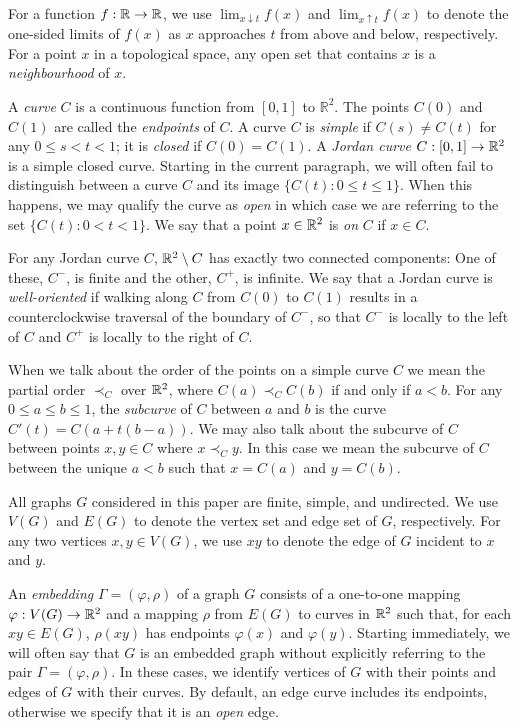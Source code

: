 \documentclass{patmorin}
\begin{document}
For a function $f:\mathbb{R}\to\mathbb{R}$, we use $\lim_{x\downarrow t} f(x)$ and
$\lim_{x\uparrow t} f(x)$ to denote the one-sided limits of $f(x)$
as $x$ approaches $t$ from above and below, respectively.  For a
point $x$ in a topological space, any open set that contains $x$ is a
\emph{neighbourhood} of $x$.  

A \emph{curve} $C$ is a continuous function from $[0,1]$
to $\mathbb{R}^2$.  The points $C(0)$ and $C(1)$ are called the
\emph{endpoints} of $C$.  A curve $C$ is \emph{simple} if $C(s)\neq C(t)$
for any $0\le s<t< 1$; it is \emph{closed} if $C(0)=C(1)$.  A \emph{Jordan
curve} $C:[0,1]\to\mathbb{R}^2$ is a simple closed curve.  Starting in the current
paragraph, we will often fail to distinguish between a curve $C$ and its
image $\{C(t):0\le t\le 1\}$.  When this happens, we may qualify the curve as
\emph{open} in which case we are referring to the set $\{C(t):0< t< 1\}$.
We say that a point $x\in\mathbb{R}^2$ is \emph{on} $C$ if $x\in C$.  

For any Jordan curve $C$, $\mathbb{R}^2\setminus C$ has exactly two connected
components: One of these, $C^-$, is finite and the other, $C^+$, is
infinite.  We say that a Jordan curve is \emph{well-oriented} if walking
along $C$ from $C(0)$ to $C(1)$ results in a counterclockwise traversal
of the boundary of $C^-$, so that $C^-$ is locally to the left of $C$
and $C^+$ is locally to the right of $C$.

When we talk about the order of the points on a simple curve $C$ we
mean the partial order $\prec_C$ over $\mathbb{R}^2$, where $C(a)\prec_C C(b)$
if and only if $a<b$.  For any $0\le a\le b\le 1$, the \emph{subcurve}
of $C$ between $a$ and $b$ is the curve $C'(t)=C(a+t(b-a))$.  We may also
talk about the subcurve of $C$ between points $x,y\in C$ where $x\prec_C
y$. In this case we mean the subcurve of $C$ between the unique $a< b$
such that $x=C(a)$ and $y=C(b)$.

All graphs $G$ considered in this paper are finite, simple, and
undirected.   We use $V(G)$ and $E(G)$ to denote the vertex set and edge
set of $G$, respectively. For any two vertices $x,y\in V(G)$, we use $xy$
to denote the edge of $G$ incident to $x$ and $y$.

An \emph{embedding} $\Gamma=(\varphi,\rho)$ of a graph $G$ consists
of a one-to-one mapping $\varphi:V(G)\to\mathbb{R}^2$ and a mapping $\rho$ from
$E(G)$ to curves in $\mathbb{R}^2$ such that, for each $xy\in E(G)$, $\rho(xy)$
has endpoints $\varphi(x)$ and $\varphi(y)$.
Starting immediately,  we will often say that $G$ is an embedded graph
without explicitly referring to the pair $\Gamma=(\varphi,\rho)$.
In these cases, we identify vertices of $G$ with their
points and edges of $G$ with their curves. By default, an edge curve includes
its endpoints, otherwise we specify that it is an \emph{open} edge.
\end{document}
